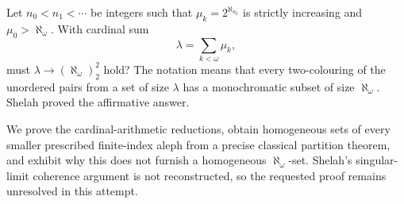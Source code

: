 Let $n_0<n_1<\cdots$ be integers such that
$\mu_k=2^{\aleph_{n_k}}$ is strictly increasing and $\mu_0>\aleph_\omega$. With cardinal sum
\[
 \lambda=\sum_{k<\omega}\mu_k,
\]
must $\lambda\to(\aleph_\omega)^2_2$ hold? The notation means that every two-colouring of the unordered pairs from a set of size $\lambda$ has a monochromatic subset of size $\aleph_\omega$. Shelah proved the affirmative answer.

We prove the cardinal-arithmetic reductions, obtain homogeneous sets of every smaller prescribed finite-index aleph from a precise classical partition theorem, and exhibit why this does not furnish a homogeneous $\aleph_\omega$-set. Shelah's singular-limit coherence argument is not reconstructed, so the requested proof remains unresolved in this attempt.
